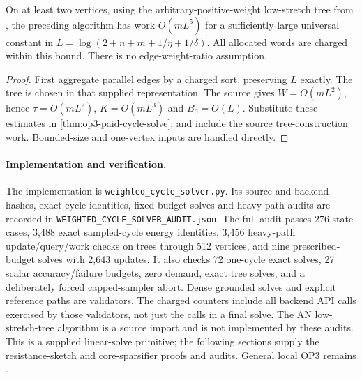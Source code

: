\begin{corollary}
\label{cor:op3-cycle-solve-near-linear}
On at least two vertices, using the arbitrary-positive-weight low-stretch tree from
\citet[Theorem 1 and Sections 6--7]{abraham2019petal}, the preceding
algorithm has work $O(mL^5)$ for a sufficiently large universal constant
in $L=\log(2+n+m+1/\eta+1/\delta)$. All allocated words are charged
within this bound. There is no edge-weight-ratio assumption.
\end{corollary}
\begin{proof}
First aggregate parallel edges by a charged sort, preserving $L$ exactly.
The tree is chosen in that supplied representation.
The source gives $W=O(mL^2)$, hence $\tau=O(mL^2)$,
$K=O(mL^3)$ and $B_0=O(L)$. Substitute these estimates in
\cref{thm:op3-paid-cycle-solve}, and include the source tree-construction
work. Bounded-size and one-vertex inputs are handled directly.
\end{proof}

\paragraph{Implementation and verification.}
The implementation is \texttt{weighted\_cycle\_solver.py}. Its source
and backend hashes, exact cycle identities, fixed-budget solves and
heavy-path audits are recorded in \texttt{WEIGHTED\_CYCLE\_SOLVER\_AUDIT.json}.
The full audit passes 276 state cases, 3,488 exact sampled-cycle energy
identities, 3,456 heavy-path update/query/work checks on trees through
512 vertices, and nine prescribed-budget solves with 2,643 updates.
It also checks 72 one-cycle exact solves, 27 scalar accuracy/failure
budgets, zero demand, exact
tree solves, and a deliberately forced capped-sampler abort.
Dense grounded solves and explicit reference paths are validators. The
charged counters include all backend API calls exercised by those
validators, not just the calls in a final solve. The AN low-stretch-tree
algorithm is a source import and is not implemented by these audits.
This is a supplied linear-solve primitive; the following sections supply
the resistance-sketch and core-sparsifier proofs and audits.
General local OP3 remains \statusopen.
